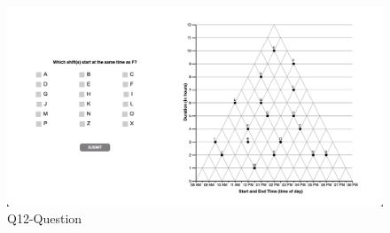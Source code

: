 \documentclass[
  letterpaper,
  DIV=11,
  numbers=noendperiod]{scrreprt}
\begin{document}
\begin{figure}

{\centering \includegraphics{analysis/SGC3A/static/questions/Q12.png}

}

\caption{\label{fig-Q12}Q12-Question}

\end{figure}
\end{document}
